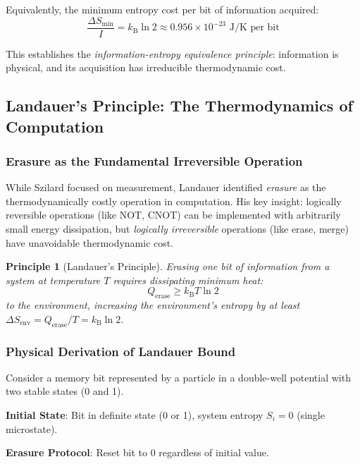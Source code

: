 \documentclass[11pt,a4paper]{article}
\newtheorem{principle}{Principle}[section]
\newcommand{\kB}{k_\text{B}}
\begin{document}
Equivalently, the minimum entropy cost per bit of information acquired:
\begin{equation}
\frac{\Delta S_{\text{min}}}{I} = \kB \ln 2 \approx 0.956 \times 10^{-23} \text{ J/K per bit}
\end{equation}

This establishes the \textit{information-entropy equivalence principle}: information is physical, and its acquisition has irreducible thermodynamic cost.

\subsection{Landauer's Principle: The Thermodynamics of Computation}

\subsubsection{Erasure as the Fundamental Irreversible Operation}

While Szilard focused on measurement, Landauer identified \textit{erasure} as the thermodynamically costly operation in computation\cite{landauer1961irreversibility}. His key insight: logically reversible operations (like NOT, CNOT) can be implemented with arbitrarily small energy dissipation, but \textit{logically irreversible} operations (like erase, merge) have unavoidable thermodynamic cost.

\begin{principle}[Landauer's Principle]
Erasing one bit of information from a system at temperature $T$ requires dissipating minimum heat:
\begin{equation}
Q_{\text{erase}} \geq \kB T \ln 2
\end{equation}
to the environment, increasing the environment's entropy by at least $\Delta S_{\text{env}} = Q_{\text{erase}}/T = \kB \ln 2$.
\end{principle}

\subsubsection{Physical Derivation of Landauer Bound}

Consider a memory bit represented by a particle in a double-well potential with two stable states (0 and 1).

\textbf{Initial State}: Bit in definite state (0 or 1), system entropy $S_i = 0$ (single microstate).

\textbf{Erasure Protocol}: Reset bit to 0 regardless of initial value.
\end{document}
